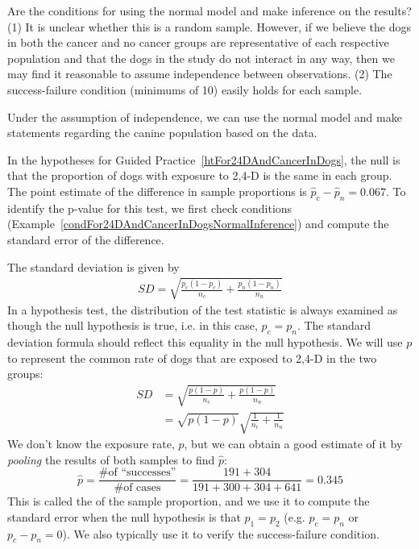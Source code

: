 \begin{example}{Are the conditions for using the normal model and make inference on the results?}\label{condFor24DAndCancerInDogsNormalInference}
(1) It is unclear whether this is a random sample. However, if we believe the dogs in both the cancer and no cancer groups are representative of each respective population and that the dogs in the study do not interact in any way, then we may find it reasonable to assume independence between observations. (2) The success-failure condition (minimums of 10) easily holds for each sample.

Under the assumption of independence, we can use the normal model and make statements regarding the canine population based on the data.
\end{example}


In the hypotheses for Guided Practice~\ref{htFor24DAndCancerInDogs}, the null is that the proportion of dogs with exposure to 2,4-D is the same in each group. The point estimate of the difference in sample proportions is $\hat{p}_c - \hat{p}_n = 0.067$. To identify the p-value for this test, we first check conditions (Example~\ref{condFor24DAndCancerInDogsNormalInference}) and compute the standard error of the difference. 

The standard deviation is given by
\begin{align*}
SD = \sqrt{\frac{p_c(1-p_c)}{n_c} + \frac{p_n(1-p_n)}{n_n}}
\end{align*}
In a hypothesis test, the distribution of the test statistic is always examined as though the null hypothesis is true, i.e. in this case, $p_c = p_n$. The standard deviation formula should reflect this equality in the null hypothesis. We will use $p$ to represent the common rate of dogs that are exposed to 2,4-D in the two groups:
\begin{align*}
SD &= \sqrt{\frac{p(1-p)}{n_c} + \frac{p(1-p)}{n_n}} \\
	&= \sqrt{p(1-p)}\sqrt{\frac{1}{n_c} + \frac{1}{n_n}}
\end{align*}
We don't know the exposure rate, $p$, but we can obtain a good estimate of it by \emph{pooling} the results of both samples to find $\hat{p}$:
$$\hat{p} = \frac{\text{\# of ``successes''}}{\text{\# of cases}} = \frac{191 + 304}{191+300+304+641} = 0.345$$
This is called the  of the sample proportion, and we use it to compute the standard error when the null hypothesis is that $p_1 = p_2$ (e.g. $p_c = p_n$ or $p_c - p_n = 0$). We also typically use it to verify the success-failure condition.

